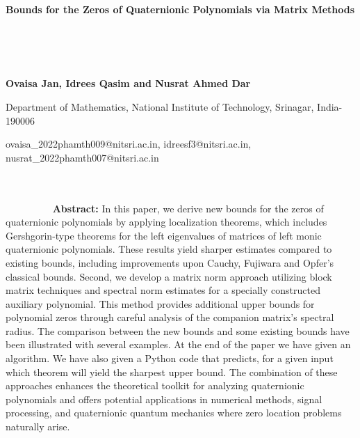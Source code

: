 \documentclass [12pt]{article}
\begin{document}
\thispagestyle{empty}
\null\vspace{-1cm}
\medskip
\vspace{1.75cm}
\centerline{\textbf{{Bounds for the Zeros of Quaternionic Polynomials via Matrix Methods}}}
~~~~~~~~~~~~~~~~~~~~~~~~~~~~~~~~~~~~~~~~~~~~~~~~~~~~~~~~~~~~~~~~~~~~~~~~~~~~~~~~~~~~~~~~~~~~~~~~~~~~~~~~~~~~~~~~~~~~~~~~~~~~~~~~~~~~~~~~~~~~~~~~~~~~~~~~~~~


\centerline{\bf  {Ovaisa Jan,}  {Idrees Qasim} and {Nusrat Ahmed Dar}}
\centerline {Department of Mathematics, National Institute of Technology, Srinagar, India-190006}
\centerline {\small{ ovaisa\_2022phamth009@nitsri.ac.in,  idreesf3@nitsri.ac.in, nusrat\_2022phamth007@nitsri.ac.in}}
~~~~~~~~~~~~~~~~~~~~~~~~~~~~~~~~~~~~~~~~~~~~~~~~~~~~~~~~~~~~~~~~~~~~~~~~~~~~~~~~~~~~~~~~~~~~~~~~~~~~~~~~~~~~~~~~~~~~~~~~~~~~~~~~~~~~~~~~~~~~~~~~~~~~~~~~~
\vskip0.1in
\noindent \textbf{Abstract:} In this paper, we derive new bounds for the zeros of quaternionic polynomials by applying localization theorems, which includes Gershgorin-type theorems for the left eigenvalues of matrices of left monic quaternionic polynomials. These results yield sharper estimates compared to existing bounds, including improvements upon Cauchy, Fujiwara and Opfer's classical bounds. Second, we develop a matrix norm approach utilizing block matrix techniques and spectral norm estimates for a specially constructed auxiliary polynomial. This method provides additional upper bounds for polynomial zeros through careful analysis of the companion matrix's spectral radius. The comparison between the new bounds and some existing bounds have been illustrated with several examples. At the end of the paper we have given an algorithm. We have also given a Python code that predicts, for a given input which theorem will yield the sharpest upper bound. The combination of these approaches enhances the theoretical toolkit for analyzing quaternionic polynomials and offers potential applications in numerical methods, signal processing, and quaternionic quantum mechanics where zero location problems naturally arise.
\end{document}
